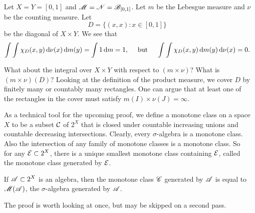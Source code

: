 \documentclass[12pt]{article} %
\begin{document}
\begin{example}
    Let $X = Y = [0,1]$ and $\mathscr{M} = \mathscr{N} = \mathscr{B}_{[0,1]}$. Let $m$ be the Lebesgue measure and $\nu$ be the counting measure. Let \[D = \{(x, x) : x \in [0,1]\}\] be the diagonal of $X \times Y$. We see that \[\int\int \chi_D(x, y) \, \mathrm{d} \nu (x) \, \mathrm{d} m (y) = \int 1\, \mathrm{d} m = 1, \ \ \ \ \text{but} \ \ \ \ \int \int \chi_D(x, y) \, \mathrm{d} m(y) \, \mathrm{d} \nu(x) = 0.\]

    What about the integral over $X \times Y$ with respect to $(m \times \nu)$? What is $(m \times \nu)(D)$? Looking at the definition of the product measure, we cover $D$ by finitely many or countably many rectangles. One can argue that at least one of the rectangles in the cover must satisfy $m(I) \times \nu(J) = \infty$.
\end{example}

As a technical tool for the upcoming proof, we define a monotone class on a space $X$ to be a subset $\mathcal{C}$ of $2^X$ that is closed under countable increasing unions and countable decreasing intersections. Clearly, every $\sigma$-algebra is a monotone class. Also the intersection of any family of monotone classes is a monotone class. So for any $\mathcal{E} \subset 2^X$, there is a unique smallest monotone class containing $\mathcal{E}$, called the monotone class generated by $\mathcal{E}$.

\begin{lemma}
    If $\mathscr{A} \subset 2^X$ is an algebra, then the monotone class $\mathscr{C}$ generated by $\mathscr{A}$ is equal to $\mathscr{M}(\mathscr{A})$, the $\sigma$-algebra generated by $\mathscr{A}$.
\end{lemma}

\noindent The proof is worth looking at once, but may be skipped on a second pass.
\end{document}
